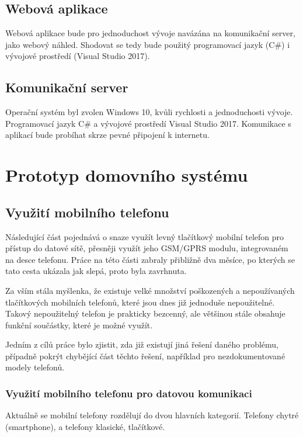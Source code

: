 \documentclass[FM,DP]{tulthesis}  %
\begin{document}
\section{Webová aplikace}
Webová aplikace bude pro jednoduchost vývoje navázána na komunikační server, jako webový náhled. Shodovat se tedy bude použitý programovací jazyk (C\#) i vývojové prostředí (Visual Studio 2017).

\section{Komunikační server}
Operační systém byl zvolen Windows 10, kvůli rychlosti a jednoduchosti vývoje. Programovací jazyk C\# a vývojové prostředí Visual Studio 2017. Komunikace s aplikací bude probíhat skrze pevné připojení k internetu.


\chapter{Prototyp domovního systému}

\section{Využití mobilního telefonu}
Následující část pojednává o snaze využít levný tlačítkový mobilní telefon pro přístup do datové sítě, přesněji využít jeho GSM/GPRS modulu, integrovaném na desce telefonu. Práce na této části zabraly přibližně dva měsíce, po kterých se tato cesta ukázala jak slepá, proto byla zavrhnuta. 

Za vším stála myšlenka, že existuje velké množství poškozených a nepoužívaných tlačítkových mobilních telefonů, které jsou dnes již jednoduše nepoužitelné. Takový nepoužitelný telefon je prakticky bezcenný, ale většinou stále obsahuje funkční součástky, které je možné využít.

Jedním z cílů práce bylo zjistit, zda již existují jiná řešení daného problému, případně pokrýt chybějící část těchto řešení, například pro nezdokumentované modely telefonů.

\subsection{Využití mobilního telefonu pro datovou komunikaci}
Aktuálně se mobilní telefony rozdělují do dvou hlavních kategorií. Telefony chytré (smartphone), a telefony klasické, tlačítkové. 
\end{document}

